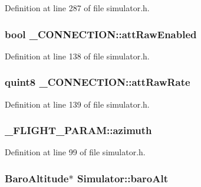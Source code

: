Definition at line 287 of file simulator.\-h.

\hypertarget{group___h_i_t_l_plugin_ga003958320fd5c963c5d2ddff60ffd28b}{
\subsubsection[{att\-Raw\-Enabled}]{\setlength{\rightskip}{0pt plus 5cm}bool \-\_\-\-C\-O\-N\-N\-E\-C\-T\-I\-O\-N\-::att\-Raw\-Enabled}}\label{group___h_i_t_l_plugin_ga003958320fd5c963c5d2ddff60ffd28b}


Definition at line 138 of file simulator.\-h.

\hypertarget{group___h_i_t_l_plugin_ga70d4f6a60b23f4545d46ff7dfe4c710e}{
\subsubsection[{att\-Raw\-Rate}]{\setlength{\rightskip}{0pt plus 5cm}quint8 \-\_\-\-C\-O\-N\-N\-E\-C\-T\-I\-O\-N\-::att\-Raw\-Rate}}\label{group___h_i_t_l_plugin_ga70d4f6a60b23f4545d46ff7dfe4c710e}


Definition at line 139 of file simulator.\-h.

\hypertarget{group___h_i_t_l_plugin_ga849192344fdd21a6a53e00920b89bbdc}{
\subsubsection[{azimuth}]{ \-\_\-\-F\-L\-I\-G\-H\-T\-\_\-\-P\-A\-R\-A\-M\-::azimuth}}\label{group___h_i_t_l_plugin_ga849192344fdd21a6a53e00920b89bbdc}


Definition at line 99 of file simulator.\-h.

\hypertarget{group___h_i_t_l_plugin_ga107f3bf3d4cc0c45cc8677742d4445eb}{
\subsubsection[{baro\-Alt}]{\setlength{\rightskip}{0pt plus 5cm}Baro\-Altitude$\ast$ Simulator\-::baro\-Alt\hspace{0.3cm}{\ttfamily [protected]}}}\label{group___h_i_t_l_plugin_ga107f3bf3d4cc0c45cc8677742d4445eb}


